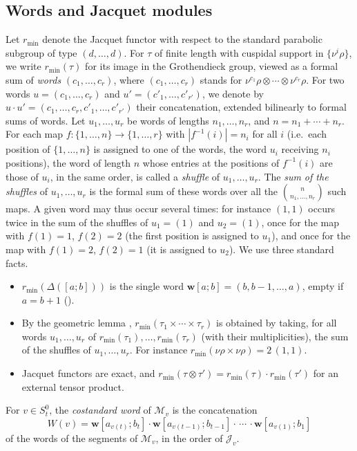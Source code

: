 \documentclass[a4paper,12pt,leqno]{amsart}
\newcommand{\caJ}{\mathcal{J}}
\newcommand{\caM}{\mathcal{M}}
\theoremstyle{plain}
\theoremstyle{definition}
\theoremstyle{definition}
\begin{document}
\subsection{Words and Jacquet modules}\label{ssec:words}
Let $r_{\min}$ denote the Jacquet functor with respect to the standard parabolic subgroup of type
$(d,\ldots,d)$. For $\tau$ of finite length with cuspidal support in $\{\nu^i\rho\}$, we write
$r_{\min}(\tau)$ for its image in the Grothendieck group, viewed as a formal sum of \emph{words}
$(c_1,\ldots,c_r)$, where $(c_1,\ldots,c_r)$ stands for
$\nu^{c_1}\rho\otimes\cdots\otimes\nu^{c_r}\rho$. For two words $u=(c_1,\ldots,c_r)$ and
$u'=(c'_1,\ldots,c'_{r'})$, we denote by $u\cdot u'=(c_1,\ldots,c_r,c'_1,\ldots,c'_{r'})$ their
concatenation, extended bilinearly to formal sums of words. Let $u_1,\ldots,u_r$ be words of lengths
$n_1,\ldots,n_r$, and $n=n_1+\cdots+n_r$. For each map $f:\{1,\ldots,n\}\rightarrow\{1,\ldots,r\}$ with
$|f^{-1}(i)|=n_i$ for all $i$ (i.e.\ each position of $\{1,\ldots,n\}$ is assigned to one of the words,
the word $u_i$ receiving $n_i$ positions), the word of length $n$ whose entries at the positions of
$f^{-1}(i)$ are those of $u_i$, in the same order, is called a \emph{shuffle} of $u_1,\ldots,u_r$. The
\emph{sum of the shuffles} of $u_1,\ldots,u_r$ is the formal sum of these words over all the
$\binom{n}{n_1,\ldots,n_r}$ such maps. A given word may thus occur several times: for instance
$(1,1)$ occurs twice in the sum of the shuffles of $u_1=(1)$ and $u_2=(1)$, once for the map
with $f(1)=1$, $f(2)=2$ (the first position is assigned to $u_1$), and once for the map with $f(1)=2$,
$f(2)=1$ (it is assigned to $u_2$). We use three
standard facts.
\begin{itemize}
\item $r_{\min}(\Delta([a;b]))$ is the single word $\mathbf{w}[a;b]=(b,b-1,\ldots,a)$, empty if
$a=b+1$ (\cite{Zel80}).
\item By the geometric lemma \cite{BZ77}, $r_{\min}(\tau_1\times\cdots\times\tau_r)$ is obtained by
taking, for all words $u_1,\ldots,u_r$ of $r_{\min}(\tau_1),\ldots,r_{\min}(\tau_r)$ (with their
multiplicities), the sum of the shuffles of $u_1,\ldots,u_r$. For instance
$r_{\min}(\nu\rho\times\nu\rho)=2\,(1,1)$.
\item Jacquet functors are exact, and $r_{\min}(\tau\otimes\tau')=r_{\min}(\tau)\cdot r_{\min}(\tau')$
for an external tensor product.
\end{itemize}
For $v\in S_t^0$, the \emph{costandard word} of $\caM_v$ is the concatenation
\[W(v)=\mathbf{w}[a_{v(t)};b_t]\cdot\mathbf{w}[a_{v(t-1)};b_{t-1}]\cdot \, \cdots \, \cdot \mathbf{w}[a_{v(1)};b_1]\]
of the words of the segments of $\caM_v$, in the order of $\caJ_v$.
\end{document}
